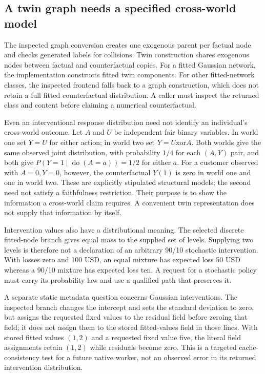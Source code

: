 \subsection{A twin graph needs a specified cross-world model}
The inspected graph conversion creates one exogenous parent per factual node and checks generated labels for collisions. Twin construction shares exogenous nodes between factual and counterfactual copies. For a fitted Gaussian network, the implementation constructs fitted twin components. For other fitted-network classes, the inspected frontend falls back to a graph construction, which does not retain a full fitted counterfactual distribution. A caller must inspect the returned class and content before claiming a numerical counterfactual.~\citep{exec24_bnlearn_sources}

Even an interventional response distribution need not identify an individual's cross-world outcome. Let $A$ and $U$ be independent fair binary variables. In world one set $Y=U$ for either action; in world two set $Y=U\mathbin{\mathrm{xor}}A$. Both worlds give the same observed joint distribution, with probability $1/4$ for each $(A,Y)$ pair, and both give $P(Y=1\mid\operatorname{do}(A=a))=1/2$ for either $a$. For a customer observed with $A=0,Y=0$, however, the counterfactual $Y(1)$ is zero in world one and one in world two. These are explicitly stipulated structural models; the second need not satisfy a faithfulness restriction. Their purpose is to show the information a cross-world claim requires. A convenient twin representation does not supply that information by itself.~\citep{exec24_bnlearn_contract}

Intervention values also have a distributional meaning. The selected discrete fitted-node branch gives equal mass to the supplied set of levels. Supplying two levels is therefore not a declaration of an arbitrary 90/10 stochastic intervention. With losses zero and 100 USD, an equal mixture has expected loss 50 USD whereas a 90/10 mixture has expected loss ten. A request for a stochastic policy must carry its probability law and use a qualified path that preserves it.~\citep{exec24_bnlearn_sources,exec24_bnlearn_contract}

A separate static metadata question concerns Gaussian interventions. The inspected branch changes the intercept and sets the standard deviation to zero, but assigns the requested fixed values to the residual field before zeroing that field; it does not assign them to the stored fitted-values field in those lines. With stored fitted values $(1,2)$ and a requested fixed value five, the literal field assignments retain $(1,2)$ while residuals become zero. This is a targeted cache-consistency test for a future native worker, not an observed error in its returned intervention distribution.~\citep{exec24_bnlearn_sources,exec24_bnlearn_contract}

